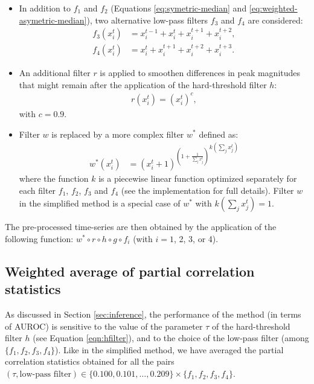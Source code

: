 \documentclass[wcp]{jmlr}
\begin{document}
\begin{itemize}
\item In addition to $f_1$ and $f_2$ (Equations \ref{eq:symetric-median} and
  \ref{eq:weighted-asymetric-median}), two alternative low-pass filters $f_3$
  and $f_4$ are considered:
\begin{align}
f_3(x^t_i) &= x^{t-1}_i + x^{t}_i + x^{t+1}_i + x^{t+2}_i, \label{eq:asymetric-median-forward} \\
f_4(x^t_i) &=  x_i^t + x^{t+1}_i  + x^{t+2}_i + x^{t+3}_i. \label{eq:asymetric-median}
\end{align}
\item An additional filter $r$ is applied to smoothen differences in peak magnitudes
  that might remain after the application of the hard-threshold filter $h$:
\begin{align}
r(x^t_i) = (x_i^t)^c,
\end{align}
with $c=0.9$.
\item Filter $w$ is replaced by a more complex filter $w^*$ defined as:
\begin{align}
 w^*(x^{t}_i) &= {(x^{t}_i + 1 )^{\left (1 + \frac{1}{\sum_{j} x^{t}_j}\right )}}^{k(\sum_{j} x^{t}_j)}
\end{align}
where the function $k$ is a piecewise linear function optimized separately for
each filter $f_1$, $f_2$, $f_3$ and $f_4$ (see the implementation for full
details). Filter $w$ in the simplified method is a special case of $w^*$ with
$k(\sum_j x_j^t)=1$.
\end{itemize}
The pre-processed time-series are then obtained by the application of the
following function: $w^*\circ r \circ h \circ g \circ f_i$ (with $i=1$, 2, 3, or 4).

\subsection{Weighted average of partial correlation statistics}
\label{sapp:averaging}

As discussed in Section \ref{sec:inference}, the performance of the method (in
terms of AUROC) is sensitive to the value of the parameter $\tau$ of the
hard-threshold filter $h$ (see Equation \ref{eqn:hfilter}), and to the choice
of the low-pass filter (among $\{f_1, f_2, f_3, f_4\}$).
Like in the simplified method, we have averaged the partial correlation statistics obtained for all the pairs $(\tau,\mbox{low-pass filter}) \in \{0.100,0.101,\ldots,0.209\}\times \{f_1, f_2, f_3, f_4\}$.
\end{document}
